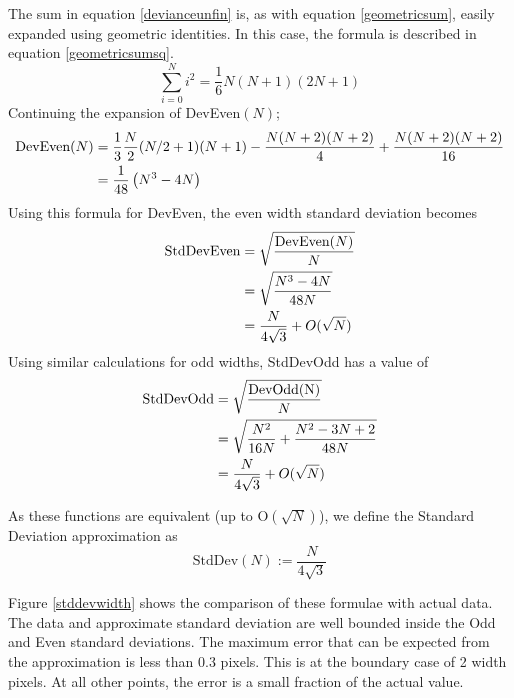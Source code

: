 \documentclass[../main.tex]{subfiles}
\begin{document}
    The sum in equation \ref{devianceunfin} is, as with equation \ref{geometricsum}, easily expanded using geometric identities.
    In this case, the formula is described in equation \ref{geometricsumsq}.
    \begin{equation}
      \sum_{i=0}^N i^2 = \frac{1}{6}N(N+1)(2N+1)
      \label{geometricsumsq}
    \end{equation}
    Continuing the expansion of DevEven$(N)$;
    \begin{align}
      \text{DevEven}(N) &= \frac{1}{3}\frac{N}{2}(N/2+1)(N+1) - \frac{N(N+2)(N+2)}{4}+\frac{N(N+2)(N+2)}{16}\notag\\
      &=\frac{1}{48}\left(N^3-4N\right)
    \end{align}
    Using this formula for DevEven, the even width standard deviation becomes
    \begin{align}
      \text{StdDevEven}&=\sqrt{\frac{\text{DevEven}(N)}{N}}\notag\\
        &=\sqrt{\frac{N^3-4N}{48N}}\notag\\
        &=\frac{N}{4\sqrt{3}}+O(\sqrt{N})
      \label{evenstddev}
    \end{align}
    Using similar calculations for odd widths, StdDevOdd has a value of
    \begin{align}
      \text{StdDevOdd}&=\sqrt{\frac{\text{DevOdd(N)}}{N}}\notag\\
        &=\sqrt{\frac{N^2}{16N}+\frac{N^2-3N+2}{48N}}\notag\\
        &=\frac{N}{4\sqrt{3}}+O(\sqrt{N})
      \label{oddstddev}
    \end{align}
  
    As these functions are equivalent (up to O$(\sqrt{N})$), we define the Standard Deviation approximation as
    \begin{equation}
      \text{StdDev}(N):=\frac{N}{4\sqrt{3}}
      \label{stddevapprox}
    \end{equation}

    Figure \ref{stddevwidth} shows the comparison of these formulae with actual data.
    The data and approximate standard deviation are well bounded inside the Odd and Even standard deviations.
    The maximum error that can be expected from the approximation is less than 0.3 pixels.
    This is at the boundary case of 2 width pixels.
    At all other points, the error is a small fraction of the actual value.
\end{document}
